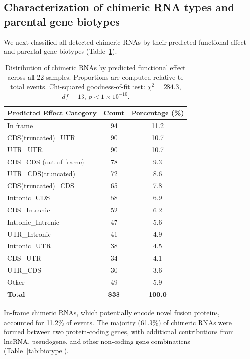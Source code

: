 \documentclass[11pt]{article}
\begin{document}
\subsection{Characterization of chimeric RNA types and parental gene biotypes}

We next classified all detected chimeric RNAs by their predicted functional effect and parental gene biotypes (Table~\ref{tab:chimeric_types}).

\begin{table}[H]
\centering
\caption{Distribution of chimeric RNAs by predicted functional effect across all 22 samples. Proportions are computed relative to total events. Chi-squared goodness-of-fit test: $\chi^{2} = 284.3$, $df = 13$, $p < 1 \times 10^{-10}$.}
\label{tab:chimeric_types}
\begin{tabular}{lcc}
\toprule
\textbf{Predicted Effect Category} & \textbf{Count} & \textbf{Percentage (\%)} \\
\midrule
In frame & 94 & 11.2 \\
CDS(truncated)\_UTR & 90 & 10.7 \\
UTR\_UTR & 90 & 10.7 \\
CDS\_CDS (out of frame) & 78 & 9.3 \\
UTR\_CDS(truncated) & 72 & 8.6 \\
CDS(truncated)\_CDS & 65 & 7.8 \\
Intronic\_CDS & 58 & 6.9 \\
CDS\_Intronic & 52 & 6.2 \\
Intronic\_Intronic & 47 & 5.6 \\
UTR\_Intronic & 41 & 4.9 \\
Intronic\_UTR & 38 & 4.5 \\
CDS\_UTR & 34 & 4.1 \\
UTR\_CDS & 30 & 3.6 \\
Other & 49 & 5.9 \\
\midrule
\textbf{Total} & \textbf{838} & \textbf{100.0} \\
\bottomrule
\end{tabular}
\end{table}

In-frame chimeric RNAs, which potentially encode novel fusion proteins, accounted for 11.2\% of events. The majority (61.9\%) of chimeric RNAs were formed between two protein-coding genes, with additional contributions from lncRNA, pseudogene, and other non-coding gene combinations (Table~\ref{tab:biotype}).
\end{document}
